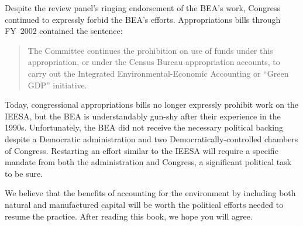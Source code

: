 Despite the review panel's ringing endorsement of the BEA's work,
Congress continued to expressly forbid the BEA's efforts.
Appropriations bills through FY~2002 contained the sentence:

\begin{quote}
	The Committee continues the prohibition on use of funds under this appropriation,
	or under the Census Bureau appropriation accounts,
	to carry out the Integrated Environmental-Economic Accounting or ``Green GDP'' initiative.
\end{quote}

Today, congressional appropriations bills no longer 
expressly prohibit work on the IEESA,
but the BEA is understandably gun-shy after their experience in the 1990s.
Unfortunately, the BEA did not receive the necessary political backing
despite a Democratic administration
and two Democratically-controlled chambers of Congress.
Restarting an effort similar to the IEESA will require a specific
mandate from both the administration and Congress, 
a significant political task to be sure.

We believe that the benefits of accounting for the environment
by including both natural and manufactured capital
will be worth the political efforts needed
to resume the practice.
After reading this book, we hope you will agree.







%
%

